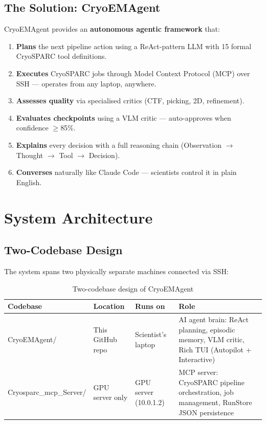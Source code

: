 \documentclass[12pt, a4paper]{article}
\begin{document}
\subsection{The Solution: CryoEMAgent}

CryoEMAgent provides an \textbf{autonomous agentic framework} that:

\begin{enumerate}[leftmargin=1.6em, label=\textbf{\arabic*.}, itemsep=4pt]
  \item \textbf{Plans} the next pipeline action using a ReAct-pattern LLM
        with 15 formal CryoSPARC tool definitions.
  \item \textbf{Executes} CryoSPARC jobs through Model Context Protocol (MCP)
        over SSH --- operates from any laptop, anywhere.
  \item \textbf{Assesses quality} via specialised critics (CTF, picking, 2D,
        refinement).
  \item \textbf{Evaluates checkpoints} using a VLM critic --- auto-approves
        when confidence $\geq$85\%.
  \item \textbf{Explains} every decision with a full reasoning chain
        (Observation $\to$ Thought $\to$ Tool $\to$ Decision).
  \item \textbf{Converses} naturally like Claude Code --- scientists control
        it in plain English.
\end{enumerate}

\section{System Architecture}
\label{sec:architecture}

\subsection{Two-Codebase Design}

The system spans two physically separate machines connected via SSH:

\begin{table}[H]
\centering
\caption{Two-codebase design of CryoEMAgent}
\label{tab:two-codebase}
\renewcommand{\arraystretch}{1.35}
\begin{tabular}{>{\ttfamily\footnotesize}l l l p{6.0cm}}
\toprule
\normalfont\textbf{Codebase} & \textbf{Location} & \textbf{Runs on}
  & \textbf{Role} \\
\midrule
CryoEMAgent/
  & This GitHub repo
  & Scientist's laptop
  & AI agent brain: ReAct planning, episodic memory, VLM critic,
    Rich TUI (Autopilot + Interactive) \\
\addlinespace
Cryosparc\_mcp\_Server/
  & GPU server only
  & GPU server (10.0.1.2)
  & MCP server: CryoSPARC pipeline orchestration, job management,
    RunStore JSON persistence \\
\bottomrule
\end{tabular}
\end{table}
\end{document}
